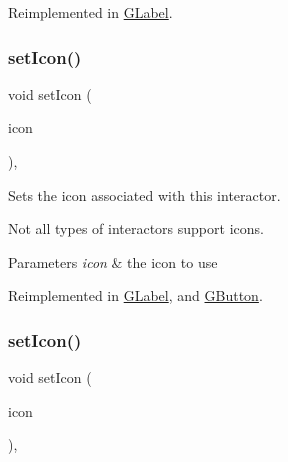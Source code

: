 Reimplemented in \mbox{\hyperlink{classGLabel_a5eead864d1249c4406f32f9944ed1503}{G\+Label}}.

\mbox{\label{classGInteractor_a542abfcd7261751352af129c7215ecda}} 
\subsubsection{\texorpdfstring{set\+Icon()}{setIcon()}\hspace{0.1cm}{\footnotesize\ttfamily [1/3]}}
{\footnotesize\ttfamily void set\+Icon (\begin{DoxyParamCaption}\item[{const Q\+Icon \&}]{icon }\end{DoxyParamCaption})\hspace{0.3cm}{\ttfamily [virtual]}, {\ttfamily [inherited]}}



Sets the icon associated with this interactor. 

Not all types of interactors support icons. 
\begin{DoxyParams}{Parameters}
{\em icon} & the icon to use \\
\hline
\end{DoxyParams}


Reimplemented in \mbox{\hyperlink{classGLabel_acca97b6c6330abded1c80521c9aca3a6}{G\+Label}}, and \mbox{\hyperlink{classGButton_acca97b6c6330abded1c80521c9aca3a6}{G\+Button}}.

\mbox{\label{classGInteractor_a368e1a338f84401c284506d03b1ba769}} 
\subsubsection{\texorpdfstring{set\+Icon()}{setIcon()}\hspace{0.1cm}{\footnotesize\ttfamily [2/3]}}
{\footnotesize\ttfamily void set\+Icon (\begin{DoxyParamCaption}\item[{const Q\+Pixmap \&}]{icon }\end{DoxyParamCaption})\hspace{0.3cm}{\ttfamily [virtual]}, {\ttfamily [inherited]}}



